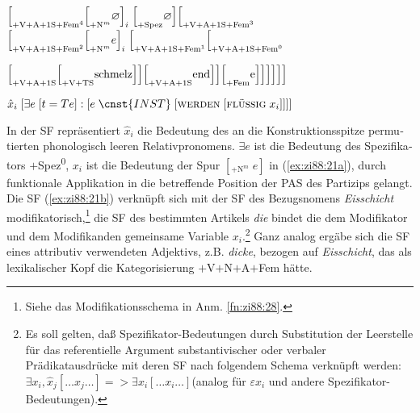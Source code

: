 \documentclass[output=paper,colorlinks,citecolor=brown, booklanguage=german]{langscibook}
\begin{document}
\begin{otherlanguage}{german}
\ea\label{ex:zi88:21}
    \ea\label{ex:zi88:21a} 
        $\Bigl[_{+\textrm{V}+\textrm{A}+\textrm{1S}+\textrm{Fem}^4} \Bigl[_{+\textrm{N}^m} \varnothing\Bigr]_i\; \Bigl[_{+\textrm{Spez}} \varnothing\Bigr] \Bigl[_{+\textrm{V}+\textrm{A}+\textrm{1S}+\textrm{Fem}^3}$ \newline \newline
        $\Bigl[_{+\textrm{V}+\textrm{A}+\textrm{1S}+\textrm{Fem}^2} \Bigl[_{+\textrm{N}^m} e\Bigr]_i\; \Bigl[_{+\textrm{V}+\textrm{A}+\textrm{1S}+\textrm{Fem}^1} \Bigl[_{+\textrm{V}+\textrm{A}+\textrm{1S}+\textrm{Fem}^0}$ \newline
        
        $\Bigl[_{+\textrm{V}+\textrm{A}+\textrm{1S}} \Bigl[_{+\textrm{V}+\textrm{TS}} \textrm{schmelz}\Bigr]\Bigr]\Bigl[_{+\textrm{V}+\textrm{A}+\textrm{1S}} \textrm{end}\Bigr]\Bigr]\Bigl[_{+\textrm{Fem}} \textrm{e}\Bigr]\Bigr]\Bigr]\Bigr]\Bigr]\Bigr]$ \newline
    
    \ex\label{ex:zi88:21b} $\hat{x}_i \; [\exists  e \; [t=Te] : [e \; \cnst{INST} \; [\textsc{werden} \; [\textsc{flüssig} \; x_i]]]]$
\z\z 

\noindent In der SF repräsentiert $\hat{x}_i$ die Bedeutung des an die Konstruktionsspitze permutierten phonologisch leeren Relativpronomens. $\exists e$ ist die Bedeutung des Spezifikators $+$Spez\textsuperscript{0},  $x_i$ ist die Bedeutung der Spur $[_{+\textrm{N}^m}\; e]$ in (\ref{ex:zi88:21a}), durch funktionale Applikation in die betreffende Position der PAS des Partizips gelangt. Die SF (\ref{ex:zi88:21b}) verknüpft sich mit der SF des Bezugsnomens \textit{Eisschicht} modifikatorisch,\footnote{Siehe das Modifikationsschema in Anm. \ref{fn:zi88:28}.} die SF des bestimmten Artikels \textit{die} bindet die dem Modifikator und dem Modifikanden gemeinsame Variable $x_i$.\footnote{\label{fn:zi88:34} Es soll gelten, daß Spezifikator-Bedeutungen durch Substitution der Leerstelle für das referentielle Argument substantivischer oder verbaler Prädikatausdrücke mit deren SF nach folgendem Schema verknüpft werden: \ea $\exists x_i, \hat{x}_j [\dots x_j \dots ] => \exists x_i [\dots x_i \dots]$\z (analog für $\varepsilon x_i$ und andere Spezifikator-Bedeutungen).} Ganz analog ergäbe sich die SF eines attributiv verwendeten Adjektivs, z.B. \textit{dicke}, bezogen auf \textit{Eisschicht}, das als lexikalischer Kopf die Kategorisierung $+$V$+$N$+$A$+$Fem hätte.


\end{otherlanguage}
\end{document}
